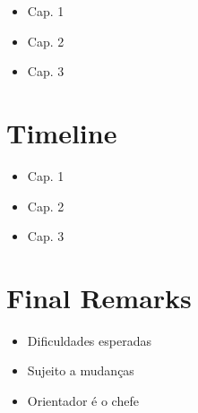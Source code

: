 \documentclass[a4paper,12pt]{article}
\begin{document}
\begin{itemize}
    \item Cap. 1
    \item Cap. 2
    \item Cap. 3
\end{itemize}

\section{Timeline}

\begin{itemize}
    \item Cap. 1
    \item Cap. 2
    \item Cap. 3
\end{itemize}

\section{Final Remarks}

\begin{itemize}
    \item Dificuldades esperadas
    \item Sujeito a mudanças
    \item Orientador é o chefe
\end{itemize}


\newpage



\end{document}
